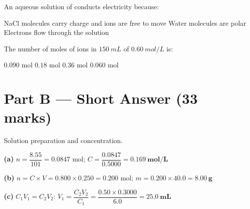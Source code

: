 \documentclass[addpoints]{exam}
\begin{document}
\begin{questions}
\question[1] An aqueous solution of  conducts electricity because:
\begin{choices}
    \choice NaCl molecules carry charge
    \correctchoice {} and  ions are free to move
    \choice Water molecules are polar
    \choice Electrons flow through the solution
\end{choices}

\question[1] The number of moles of  ions in $\SI{150}{mL}$ of
$\SI{0.60}{mol/L}$  is:
\begin{choices}
    \choice $0.090$ mol
    \correctchoice $0.18$ mol
    \choice $0.36$ mol
    \choice $0.060$ mol
\end{choices}


\section*{Part B --- Short Answer (33 marks)}

\question Solution preparation and concentration.
\begin{solution}[9cm]
\textbf{(a)} $n = \dfrac{8.55}{101} = 0.0847$ mol;\quad
$C = \dfrac{0.0847}{0.5000} = \mathbf{\SI{0.169}{mol/L}}$

\textbf{(b)} $n = C \times V = 0.800 \times 0.250 = 0.200$ mol;\quad
$m = 0.200 \times 40.0 = \mathbf{\SI{8.00}{g}}$

\textbf{(c)} $C_1V_1 = C_2V_2$:\quad
$V_1 = \dfrac{C_2V_2}{C_1} = \dfrac{0.50 \times 0.3000}{6.0} = \mathbf{\SI{25.0}{mL}}$


\end{solution}
\end{questions}
\end{document}
